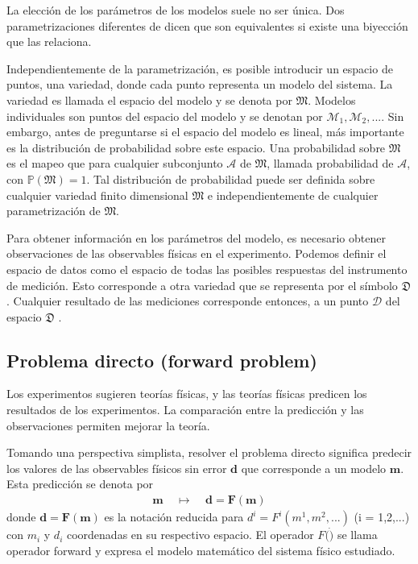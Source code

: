 \documentclass{article}
\begin{document}
La elección de los parámetros de los modelos suele no ser única. Dos parametrizaciones diferentes de dicen que son equivalentes si existe una biyección que las relaciona.

Independientemente de la parametrización, es posible introducir un espacio de puntos, una variedad, donde cada punto representa un modelo del sistema. La variedad es llamada el espacio del modelo y se denota por $\mathfrak{M}$. Modelos individuales son puntos del espacio del modelo y se denotan por $\mathscr{M}_1, \mathscr{M}_2, ...$. Sin embargo, antes de preguntarse si el espacio del modelo es lineal, más importante es la distribución de probabilidad sobre este espacio. Una probabilidad sobre $\mathfrak{M}$ es el mapeo que para cualquier subconjunto $\mathcal{A}$ de $\mathfrak{M}$, llamada probabilidad de $\mathcal{A}$, con $\mathbb{P}\left (\mathfrak{M} \right ) = 1 $. Tal distribución de probabilidad puede ser definida sobre cualquier variedad finito dimensional $\mathfrak{M}$ e independientemente de cualquier parametrización de $\mathfrak{M}$.

Para obtener información en los parámetros del modelo, es necesario obtener observaciones de las observables físicas en el experimento. Podemos definir el espacio de datos como el espacio de todas las posibles respuestas del instrumento de medición. Esto corresponde a otra variedad que se representa por el símbolo $\mathfrak{D}$. Cualquier resultado de las mediciones corresponde entonces, a un punto $\mathscr{D}$ del espacio $\mathfrak{D}$ \cite{tarantola2005inverse}.



\subsection{Problema directo (forward problem)}

Los experimentos sugieren teorías físicas, y las teorías físicas predicen los resultados de los experimentos. La comparación entre la predicción y las observaciones permiten mejorar la teoría.

Tomando una perspectiva simplista, resolver el problema directo significa predecir los valores de las observables físicos sin error $\mathbf{d}$ que corresponde a un modelo $\mathbf{m}$. Esta predicción se denota por 
\begin{align*}
    \mathbf{m} \:\:\:\:\: \mapsto \:\:\:\:\: \mathbf{d} = \mathbf{F(m)}
\end{align*}
donde $\mathbf{d} = \mathbf{F(m)} $ es la notación reducida para $ d ^i = F^i(m^1,m^2,...)$ (i = 1,2,...) con $m_i$ y $d_i$ coordenadas en su respectivo espacio. El operador $F(\dot) $ se llama operador forward y expresa el modelo matemático del sistema físico estudiado.
\end{document}
